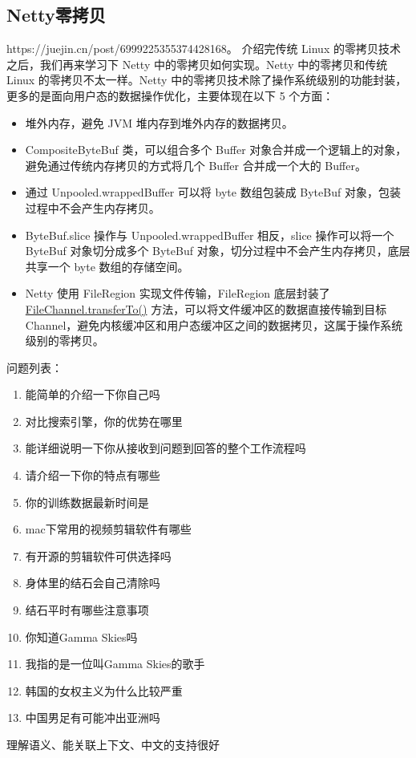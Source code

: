 \documentclass[../../../interview-questions.tex]{subfiles}
\begin{document}
\subsection{Netty零拷贝}

https://juejin.cn/post/6999225355374428168。
介绍完传统 Linux 的零拷贝技术之后，我们再来学习下 Netty 中的零拷贝如何实现。Netty 中的零拷贝和传统 Linux 的零拷贝不太一样。Netty 中的零拷贝技术除了操作系统级别的功能封装，更多的是面向用户态的数据操作优化，主要体现在以下 5 个方面：

\begin{itemize}
    \item {堆外内存，避免 JVM 堆内存到堆外内存的数据拷贝。}
    \item {CompositeByteBuf 类，可以组合多个 Buffer 对象合并成一个逻辑上的对象，避免通过传统内存拷贝的方式将几个 Buffer 合并成一个大的 Buffer。}
    \item {通过 Unpooled.wrappedBuffer 可以将 byte 数组包装成 ByteBuf 对象，包装过程中不会产生内存拷贝。}
    \item {ByteBuf.slice 操作与 Unpooled.wrappedBuffer 相反，slice 操作可以将一个 ByteBuf 对象切分成多个 ByteBuf 对象，切分过程中不会产生内存拷贝，底层共享一个 byte 数组的存储空间。}
    \item {Netty 使用 FileRegion 实现文件传输，FileRegion 底层封装了 \url{FileChannel.transferTo()} 方法，可以将文件缓冲区的数据直接传输到目标 Channel，避免内核缓冲区和用户态缓冲区之间的数据拷贝，这属于操作系统级别的零拷贝。}
\end{itemize}

\newpage

问题列表：

\begin{enumerate}
    \item {能简单的介绍一下你自己吗}
    \item {对比搜索引擎，你的优势在哪里}
    \item {能详细说明一下你从接收到问题到回答的整个工作流程吗}
    \item {请介绍一下你的特点有哪些}
    \item {你的训练数据最新时间是}
    \item {mac下常用的视频剪辑软件有哪些}
    \item {有开源的剪辑软件可供选择吗}
    \item {身体里的结石会自己清除吗}
    \item {结石平时有哪些注意事项}
    \item {你知道Gamma Skies吗}
    \item {我指的是一位叫Gamma Skies的歌手}
    \item {韩国的女权主义为什么比较严重}
    \item {中国男足有可能冲出亚洲吗}
\end{enumerate}


理解语义、能关联上下文、中文的支持很好


\newpage
\end{document}
